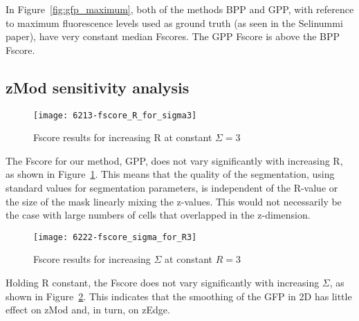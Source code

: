 In Figure~\ref{fig:gfp_maximum}, both of the methods BPP and GPP, with reference to maximum fluorescence levels used as ground truth (as seen in the Selinummi paper), have very constant median Fscores. The GPP Fscore is above the BPP Fscore.

\subsection{zMod sensitivity analysis}

\begin{figure}[htbp!]
\centering
\texttt{[image: 6213-fscore\_R\_for\_sigma3]}
\caption{Fscore results for increasing R at constant $\Sigma=3$}
\label{fig:fscore_sigma3}
\end{figure}

The Fscore for our method, GPP, does not vary significantly with increasing R, as shown in Figure~\ref{fig:fscore_sigma3}. This means that the quality of the segmentation, using standard values for segmentation parameters, is independent of the R-value or the size of the mask linearly mixing the z-values. This would not necessarily be the case with large numbers of cells that overlapped in the z-dimension.

\begin{figure}[htbp!]
\centering
\texttt{[image: 6222-fscore\_sigma\_for\_R3]}
\caption{Fscore results for increasing $\Sigma$ at constant $R=3$}
\label{fig:fscore_r3}
\end{figure}

Holding R constant, the Fscore does not vary significantly with increasing $\Sigma$, as shown in Figure~\ref{fig:fscore_r3}. This indicates that the smoothing of the GFP in 2D has little effect on zMod and, in turn, on zEdge.
